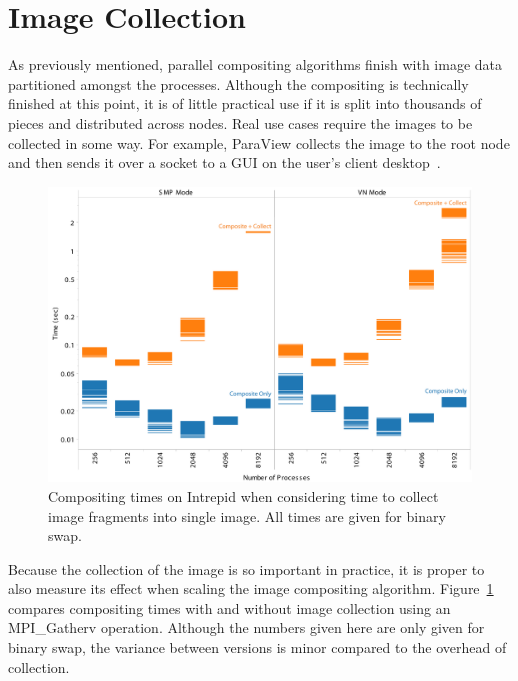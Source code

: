 \documentclass{acm_proc_article-sp}
\newcommand*{\lcite}[1]{~\cite{#1}}
\begin{document}
\section{Image Collection}
\label{sec:ImageCollection}

As previously mentioned, parallel compositing algorithms finish with image
data partitioned amongst the processes.  Although the compositing is
technically finished at this point, it is of little practical use if it is
split into thousands of pieces and distributed across nodes.  Real use
cases require the images to be collected in some way.  For example,
ParaView collects the image to the root node and then sends it over a
socket to a GUI on the user's client desktop\lcite{Cedilnik2006}.

\begin{figure}[htbp]
  \centering
  \includegraphics[width=\linewidth]{images/PartitionCollectIntrepidFull}
  \caption{Compositing times on Intrepid when considering time to collect
    image fragments into single image.  All times are given for binary
    swap.}
  \label{fig:PartitionCollectFull}
\end{figure}

Because the collection of the image is so important in practice, it is
proper to also measure its effect when scaling the image compositing
algorithm.  Figure~\ref{fig:PartitionCollectFull} compares compositing
times with and without image collection using an MPI\_Gatherv operation.
Although the numbers given here are only given for binary swap, the
variance between versions is minor compared to the overhead of collection.
\end{document}
